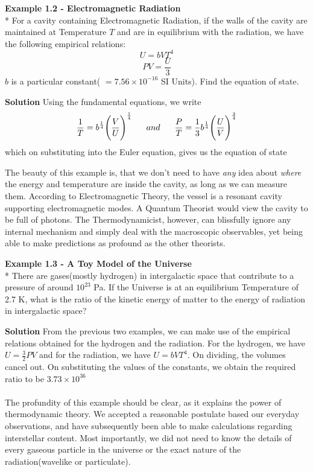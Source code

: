 \documentclass[oneside]{book}
\begin{document}
\begin{mdframed}[style=exercise]
\textbf{Example 1.2 - Electromagnetic Radiation}
\\*
For a cavity containing Electromagnetic Radiation, if the walls of the cavity are maintained at Temperature $T$ and are in equilibrium with the radiation, we have the following empirical relations:
\[U = bVT^4\]
\[PV = \frac{U}{3}\]
$b$ is a particular constant( $ = 7.56 \times 10^{-16}$ SI Units). Find the equation of state. 
\\ 
\end{mdframed}
\textbf{Solution} Using the fundamental equations, we write\
 \[ \frac{1}{T} = b^{\frac{1}{4}} \Bigg( \frac{V}{U} \Bigg) ^{\frac{1}{4}} \hspace{0.6 cm} and \hspace{0.6 cm} \frac{P}{T} = \frac{1}{3} b^{\frac{1}{4}} \Bigg( \frac{U}{V} \Bigg) ^{\frac{3}{4}} \]
 which on substituting into the Euler equation, gives us the equation of state
  \begin{center}
  \end{center}
The beauty of this example is, that we don't need to have \emph{any} idea about \emph{where} the energy and temperature are inside the cavity, as long as we can measure them. According to Electromagnetic Theory, the vessel is a resonant cavity supporting electromagnetic modes. A Quantum Theorist would view the cavity to be full of photons. The Thermodynamicist, however, can blissfully ignore any internal mechanism and simply deal with the macroscopic observables, yet being able to make predictions as profound as the other theorists.



\begin{mdframed}[style=exercise]
\textbf{Example 1.3 - A Toy Model of the Universe}
\\*
There are gases(mostly hydrogen) in intergalactic space that contribute to a pressure of around $10^{23}$ Pa. If the Universe is at an equilibrium Temperature of 2.7 K, what is the ratio of the kinetic energy of matter to the energy of radiation in intergalactic space? 
\\ 
\end{mdframed}
\textbf{Solution} From the previous two examples, we can make use of the empirical relations obtained for the hydrogen and the radiation. For the hydrogen, we have $U = \frac{3}{2}PV$ and for the radiation, we have $U = bVT^4$. On dividing, the volumes cancel out. On substituting the values of the constants, we obtain the required ratio to be $3.73 \times 10^{36}$\\ \\
The profundity of this example should be clear, as it explains the power of thermodynamic theory. We accepted a reasonable postulate based our everyday observations, and have subsequently been able to make calculations regarding interstellar content. Most importantly, we did not need to know the details of every gaseous particle in the universe or the exact nature of the radiation(wavelike or particulate).
\end{document}

